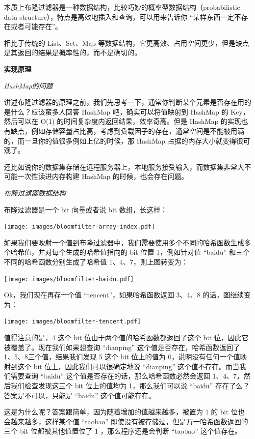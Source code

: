 \documentclass[cn,11pt,chinese]{elegantbook}
\begin{document}
本质上布隆过滤器是一种数据结构，比较巧妙的概率型数据结构（probabilistic
data structure），特点是高效地插入和查询，可以用来告诉你
``某样东西一定不存在或者可能存在''。

相比于传统的 List、Set、Map
等数据结构，它更高效、占用空间更少，但是缺点是其返回的结果是概率性的，而不是确切的。

\textbf{实现原理}

\emph{HashMap的问题}

讲述布隆过滤器的原理之前，我们先思考一下，通常你判断某个元素是否存在用的是什么？应该蛮多人回答
HashMap 吧，确实可以将值映射到 HashMap 的 Key，然后可以在 O(1)
的时间复杂度内返回结果，效率奇高。但是 HashMap
的实现也有缺点，例如存储容量占比高，考虑到负载因子的存在，通常空间是不能被用满的，而一旦你的值很多例如上亿的时候，那
HashMap 占据的内存大小就变得很可观了。

还比如说你的数据集存储在远程服务器上，本地服务接受输入，而数据集非常大不可能一次性读进内存构建
HashMap 的时候，也会存在问题。

\emph{布隆过滤器数据结构}

布隆过滤器是一个 bit 向量或者说 bit 数组，长这样：

\texttt{[image: images/bloomfilter-array-index.pdf]}

如果我们要映射一个值到布隆过滤器中，我们需要使用多个不同的哈希函数生成多个哈希值，并对每个生成的哈希值指向的
bit 位置 1，例如针对值 ``baidu'' 和三个不同的哈希函数分别生成了哈希值
1、4、7，则上图转变为：

\texttt{[image: images/bloomfilter-baidu.pdf]}

Ok，我们现在再存一个值 ``tencent''，如果哈希函数返回 3、4、8
的话，图继续变为：

\texttt{[image: images/bloomfilter-tencent.pdf]}

值得注意的是，4 这个 bit 位由于两个值的哈希函数都返回了这个 bit
位，因此它被覆盖了。现在我们如果想查询 ``dianping''
这个值是否存在，哈希函数返回了 1、5、8三个值，结果我们发现 5 这个 bit
位上的值为 0，说明没有任何一个值映射到这个 bit
位上，因此我们可以很确定地说 ``dianping'' 这个值不存在。而当我们需要查询
``baidu'' 这个值是否存在的话，那么哈希函数必然会返回
1、4、7，然后我们检查发现这三个 bit 位上的值均为 1，那么我们可以说
``baidu'' 存在了么？答案是不可以，只能是 ``baidu'' 这个值可能存在。

这是为什么呢？答案跟简单，因为随着增加的值越来越多，被置为 1 的 bit
位也会越来越多，这样某个值 ``taobao''
即使没有被存储过，但是万一哈希函数返回的三个 bit 位都被其他值置位了 1
，那么程序还是会判断 ``taobao'' 这个值存在。
\end{document}
